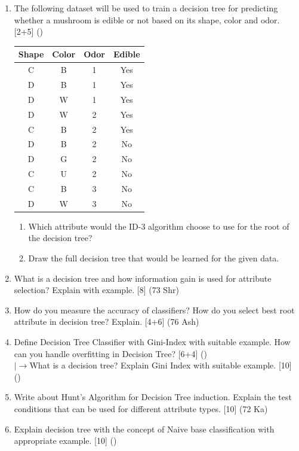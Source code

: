 \documentclass[12pt]{article}
\newcommand{\lb}{\\$\left|\rightarrow\right.$}
\begin{document}
\begin{enumerate}[topsep=0pt, noitemsep]
      \item The following dataset will be used to train a decision tree for predicting whether a mushroom is edible or not based on its shape, color and odor. \hfill [2+5] ()\\
        \small
        \begin{tabular}{|c|c|c|c|}
          \hline
          Shape & Color & Odor & Edible \\ \hline
          C & B & 1 & Yes \\ \hline
          D & B & 1 & Yes \\ \hline
          D & W & 1 & Yes \\ \hline
          D & W & 2 & Yes \\ \hline
          C & B & 2 & Yes \\ \hline
          D & B & 2 & No \\ \hline
          D & G & 2 & No \\ \hline
          C & U & 2 & No \\ \hline
          C & B & 3 & No \\ \hline
          D & W & 3 & No \\ \hline
        \end{tabular}
        \normalsize
        \begin{enumerate}[label=(\alph*),topsep=2pt,noitemsep]
          \item Which attribute would the ID-3 algorithm choose to use for the root of the decision tree?
          \item Draw the full decision tree that would be learned for the given data.
        \end{enumerate}

      \item What is a decision tree and how information gain is used for attribute selection? Explain with example. \hfill [8] (73 Shr)

      \item How do you measure the accuracy of classifiers? How do you select best root attribute in decision tree? Explain. \hfill [4+6] (76 Ash)

      \item Define Decision Tree Classifier with Gini-Index with suitable example. How can you handle overfitting in Decision Tree? \hfill [6+4] ()
        \lb What is a decision tree? Explain Gini Index with suitable example. \hfill [10] ()

      \item Write about Hunt's Algorithm for Decision Tree induction. Explain the test conditions that can be used for different attribute types. \hfill [10] (72 Ka)

      \item Explain decision tree with the concept of Naive base classification with appropriate example. \hfill [10] ()
    \end{enumerate}
\end{document}
